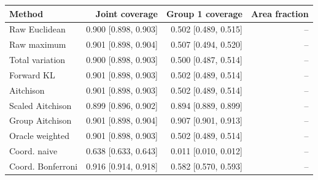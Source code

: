 \begin{tabular}{lrrr}
\toprule
Method & Joint coverage & Group 1 coverage & Area fraction \\
\midrule
Raw Euclidean & 0.900 [0.898, 0.903] & 0.502 [0.489, 0.515] & -- \\
Raw maximum & 0.901 [0.898, 0.904] & 0.507 [0.494, 0.520] & -- \\
Total variation & 0.900 [0.898, 0.903] & 0.500 [0.487, 0.514] & -- \\
Forward KL & 0.901 [0.898, 0.903] & 0.502 [0.489, 0.514] & -- \\
Aitchison & 0.901 [0.898, 0.903] & 0.502 [0.489, 0.514] & -- \\
Scaled Aitchison & 0.899 [0.896, 0.902] & 0.894 [0.889, 0.899] & -- \\
Group Aitchison & 0.901 [0.898, 0.904] & 0.907 [0.901, 0.913] & -- \\
Oracle weighted & 0.901 [0.898, 0.903] & 0.502 [0.489, 0.514] & -- \\
Coord. naive & 0.638 [0.633, 0.643] & 0.011 [0.010, 0.012] & -- \\
Coord. Bonferroni & 0.916 [0.914, 0.918] & 0.582 [0.570, 0.593] & -- \\
\bottomrule
\end{tabular}
